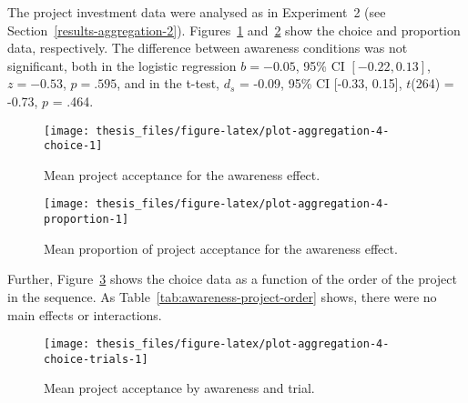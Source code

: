 \documentclass[a4paper, nobind]{templates/ociamthesis}
\theoremstyle{definition}
\theoremstyle{definition}
\theoremstyle{definition}
\theoremstyle{definition}
\theoremstyle{remark}
\begin{document}
The project investment data were analysed as in Experiment~2 (see
Section~\ref{results-aggregation-2}).
Figures~\ref{fig:plot-aggregation-4-choice}
and~\ref{fig:plot-aggregation-4-proportion} show the choice and proportion
data, respectively. The difference between awareness conditions was not
significant, both in the logistic regression
\(b = -0.05\), 95\% CI \([-0.22, 0.13]\), \(z = -0.53\), \(p = .595\), and in the t-test,
\(d_s\) = -0.09, 95\% CI {[}-0.33, 0.15{]}, \(t\)(264) = -0.73, \(p\) = .464.



\begin{figure}
\texttt{[image: thesis\_files/figure-latex/plot-aggregation-4-choice-1]} \caption{Mean project acceptance for the awareness effect.}\label{fig:plot-aggregation-4-choice}
\end{figure}



\begin{figure}
\texttt{[image: thesis\_files/figure-latex/plot-aggregation-4-proportion-1]} \caption{Mean proportion of project acceptance for the awareness effect.}\label{fig:plot-aggregation-4-proportion}
\end{figure}

Further, Figure~\ref{fig:plot-aggregation-4-choice-trials} shows the choice
data as a function of the order of the project in the sequence. As
Table~\ref{tab:awareness-project-order} shows, there were no main effects or
interactions.



\begin{figure}
\texttt{[image: thesis\_files/figure-latex/plot-aggregation-4-choice-trials-1]} \caption{Mean project acceptance by awareness and trial.}\label{fig:plot-aggregation-4-choice-trials}
\end{figure}
\end{document}
